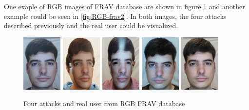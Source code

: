 One exaple of RGB images of FRAV database are shown in figure \ref{fig:RGB-frav1} and another example could be seen in \ref{fig:RGB-frav2}. In both images, the four attacks described previously and the real user could be visualized. \\

\begin{figure}[htb]
\centering
\includegraphics[width=0.18\textwidth]{images_databases/fravrgb/at1-0.JPG}
\includegraphics[width=0.18\textwidth]{images_databases/fravrgb/at2-0.JPG}
\includegraphics[width=0.18\textwidth]{images_databases/fravrgb/at3-0.JPG}
\includegraphics[width=0.18\textwidth]{images_databases/fravrgb/at4-0.JPG}
\includegraphics[width=0.18\textwidth]{images_databases/fravrgb/real0.JPG}

\caption{Four attacks and real user from RGB FRAV database } \label{fig:RGB-frav1}
\end{figure}

